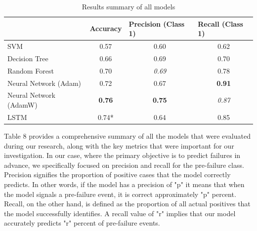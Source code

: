 \documentclass{article}
\begin{document}
\begin{table}[htbp]
\caption{Results summary of all models}
\centering
\begin{tabular}{l|c|c|c|}
\cline{2-4}
                                             & \multicolumn{1}{l|}{Accuracy} & \multicolumn{1}{l|}{Precision (Class 1)} & \multicolumn{1}{l|}{Recall (Class 1)} \\ \hline
\multicolumn{1}{|l|}{SVM}                    & 0.57                          & 0.60                                     & 0.62                                  \\
\multicolumn{1}{|l|}{Decision Tree}          & 0.66                          & 0.69                                     & 0.70                                  \\
\multicolumn{1}{|l|}{Random Forest}          & 0.70                          & \textit{0.69}                            & 0.78                                  \\
\multicolumn{1}{|l|}{Neural Network (Adam)}  & 0.72                          & 0.67                                     & \textbf{0.91}                         \\
\multicolumn{1}{|l|}{Neural Network (AdamW)} & \textbf{0.76}                 & \textbf{0.75}                            & \textit{0.87}                         \\
\multicolumn{1}{|l|}{LSTM}                   & 0.74*                         & 0.64                                    & 0.85                                \\ \hline
\end{tabular}
\end{table}

Table 8 provides a comprehensive summary of all the models that were evaluated during our research, along with the key metrics that were important for our investigation. In our case, where the primary objective is to predict failures in advance, we specifically focused on precision and recall for the pre-failure class.\\

Precision signifies the proportion of positive cases that the model correctly predicts. In other words, if the model has a precision of "p" it means that when the model signals a pre-failure event, it is correct approximately "p" percent.\\

Recall, on the other hand, is defined as the proportion of all actual positives that the model successfully identifies. A recall value of "r" implies that our model accurately predicts "r" percent of pre-failure events.\\
\end{document}
